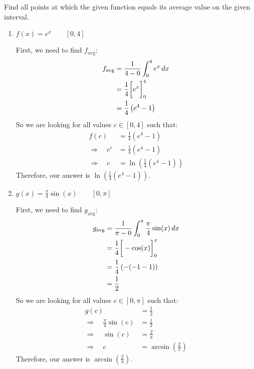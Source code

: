 \documentclass[handout,nooutcomes]{ximera}
\begin{document}
	
	
	
			
			

\begin{problem}

Find all points at which the given function equals its average value on the given interval.
	\begin{enumerate}
	
	\item  $f(x) = e^x	\qquad	[0,4]$
		\begin{freeResponse}
		First, we need to find $f_{\text{avg}}$:
			\begin{align*}
			f_{\text{avg}} &= \frac{1}{4-0} \int_0^4 e^x \,d x  \\
			&= \frac{1}{4} \bigg[ e^x \bigg]_0^4  \\
			&= \frac{1}{4} \left( e^4 - 1 \right)  
			\end{align*}
		So we are looking for all values $c \in [0,4]$ such that:
			\begin{align*}
			f(c) &= \frac{1}{4} (e^4 - 1)  \\
			\Longrightarrow \quad e^c &= \frac{1}{4} (e^4 - 1)  \\
			\Longrightarrow \quad c &= \ln \left( \frac{1}{4} (e^4 - 1) \right)
			\end{align*}
		Therefore, our answer is $\ln \left( \frac{1}{4} (e^4 - 1) \right)$.
		\end{freeResponse}
		
		
		
	\item  $g(x) = \frac{\pi}{4} \sin(x)	\qquad	[0,\pi]$
		\begin{freeResponse}
		First, we need to find $g_{\text{avg}}$:
			\begin{align*}
			g_{\text{avg}} &= \frac{1}{\pi-0} \int_0^{\pi} \frac{\pi}{4} \sin(x) \,d x  \\
			&= \frac{1}{4} \bigg[ -\cos(x) \bigg]_0^{\pi}  \\
			&= \frac{1}{4} \left( - (-1-1) \right)  \\
			&= \frac{1}{2}
			\end{align*}
		So we are looking for all values $c \in [0,\pi]$ such that:
			\begin{align*}
			g(c) &= \frac{1}{2}  \\
			\Longrightarrow \quad \frac{\pi}{4} \sin(c) &= \frac{1}{2}  \\
			\Longrightarrow \quad \sin(c) &= \frac{2}{\pi}  \\
			\Longrightarrow \quad c &= \arcsin \left( \frac{2}{\pi} \right)
			\end{align*}
		Therefore, our answer is $\arcsin \left( \frac{2}{\pi} \right)$.
		\end{freeResponse}
		
		
		
	\end{enumerate}
			
			
		
\end{problem}
\end{document}
